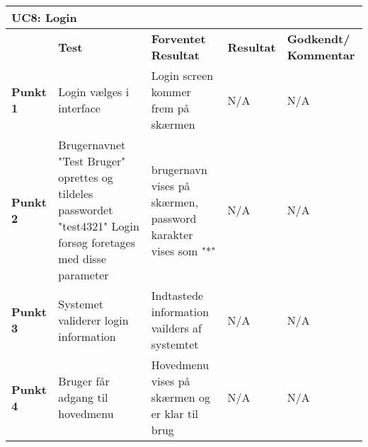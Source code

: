 \begin{table}[htbp] \centering
\begin{tabular}{|p{}|p{}|p{3cm}|p{3cm}|p{3cm}|} %
	\hline
\multicolumn{5}{|l|}{\textbf{UC8: Login}} \\\hline
&\textbf{Test} &\textbf{Forventet \newline Resultat} &\textbf{Resultat} &\textbf{Godkendt/ \newline Kommentar} \\\hline
\textbf{Punkt 1}		
&Login vælges i interface	
&Login screen kommer frem på skærmen 	
&N/A 	
&N/A \\\hline
\textbf{Punkt 2}		
&Brugernavnet "Test Bruger" oprettes og tildeles passwordet "test4321" Login forsøg foretages med disse parameter	
&brugernavn vises på skærmen, password karakter vises som "*" 	
&N/A 	
&N/A \\\hline
\textbf{Punkt 3}		
&Systemet validerer login information		
&Indtastede information vailders af systemtet 	
&N/A 	
&N/A \\\hline
\textbf{Punkt 4}		
&Bruger får adgang til hovedmenu		
&Hovedmenu vises på skærmen og er klar til brug 	
&N/A 	
&N/A  \\\hline
	\end{tabular}
	\label{ATUC8} 
\end{table}